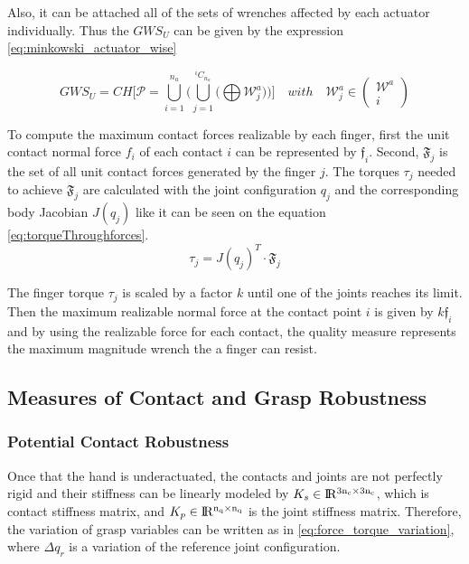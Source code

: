 Also, it can be attached all of the sets of wrenches affected by each actuator individually. Thus the $GWS_U$ can be given by the expression \eqref{eq:minkowski_actuator_wise}

\begin{equation}\label{eq:minkowski_actuator_wise}
    GWS_U = CH\Bigg[
    \mathcal{P}=\bigcup_{i=1}^{n_a}\Bigg(\bigcup_{j=1}^{{}^iC_{n_a}} \big( \bigoplus \mathcal{W}_j^a \big) \Bigg) \Bigg]
    \quad with \quad \mathcal{W}^a_j \in 
\left( \begin{array}{c}
             \mathcal{W}^a    \\
              i  
    \end{array} \right) 
\end{equation}

To compute the maximum contact forces realizable by each finger, first the unit contact normal force $f_i$ of each contact $i$ can be represented by $\mathfrak{f}_i$. Second, $\mathfrak{F}_j$ is the set of all unit contact forces generated by the finger $j$. The torques $\tau_j$ needed to achieve  $\mathfrak{F}_j$ are calculated with the joint configuration $q_j$ and the corresponding body Jacobian $J(q_j)$ like it can be seen on the equation \eqref{eq:torqueThroughforces}.
\begin{equation}\label{eq:torqueThroughforces}
    \tau_j = J(q_j)^T \cdot \mathfrak{F}_j
\end{equation}

The finger torque $\tau_j$ is scaled by a factor $k$ until one of the joints reaches its limit. Then the maximum realizable normal force at the contact point $i$ is given by $k\mathfrak{f}_i$ and by using the realizable force for each contact, the quality measure represents the maximum magnitude wrench the a finger can resist.

\subsection{Measures of Contact and Grasp Robustness}

\subsubsection{Potential Contact Robustness}

Once that the hand is underactuated, the contacts and joints are not perfectly rigid and their stiffness can be linearly modeled by $K_s \in \rm I\!R^{3n_c \times 3n_c} $, which is contact stiffness matrix, and $K_p \in \rm I\!R^{n_q \times n_q} $ is the joint stiffness matrix.
Therefore, the variation of grasp variables can be written as in \eqref{eq:force_torque_variation}, where $\Delta q_r$ is a variation of the reference joint configuration.

